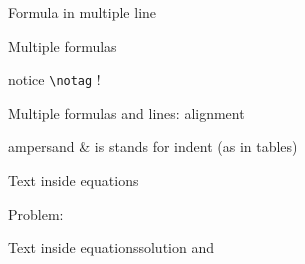 \begin{frame}[fragile]{Formula in multiple line\magicPage}\relax
{}

    \cprotect{}

\end{frame}


\begin{frame}[fragile]{Multiple formulas\magicPage}\relax

    \cprotect{}

\inpause
notice \lstinline[basicstyle=\tt\normalsize]|\notag| !

\cprotect{}

\end{frame}

\begin{frame}[fragile]{Multiple formulas and lines: alignment\magicPage}\relax
\cprotect{}
\cprotect{}


ampersand {\csk \&} is stands for indent (as in tables)
\cprotect{}
\end{frame}

\begin{frame}[fragile, t]{Text inside equations\magicPage}\relax

\cprotect{}

Problem:
\cprotect{}

\end{frame}
\begin{frame}[fragile]{Text inside equations\magicPage}{solution}\relax
\cprotect{}
\ccol{\text} and \ccol{\intertext}
\end{frame}

